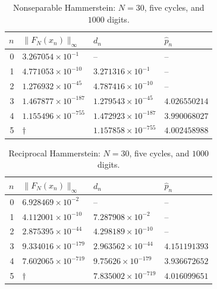 \documentclass[11pt,a4paper]{article}
\numberwithin{equation}{section}
\numberwithin{table}{section}
\theoremstyle{plain}
\theoremstyle{definition}\newtheorem{definition}[theorem]{Definition}
\theoremstyle{remark}\newtheorem{remark}[theorem]{Remark}
\begin{document}
\begin{table}[htbp]\centering\small
\begin{tabular}{@{}rlll@{}}\toprule
$n$ & $\|F_N(x_n)\|_\infty$ & $d_n$ & $\widehat p_n$\\\midrule
0 & $3.267054\times10^{-1}$ & -- & --\\
1 & $4.771053\times10^{-10}$ & $3.271316\times10^{-1}$ & --\\
2 & $1.276932\times10^{-45}$ & $4.787416\times10^{-10}$ & --\\
3 & $1.467877\times10^{-187}$ & $1.279543\times10^{-45}$ & $4.026550214$\\
4 & $1.155496\times10^{-755}$ & $1.472923\times10^{-187}$ & $3.990068027$\\
5 & $\dagger$ & $1.157858\times10^{-755}$ & $4.002458988$\\
\bottomrule\end{tabular}
\caption{Nonseparable Hammerstein: $N=30$, five cycles, and $1000$ digits.}\label{supp:tab:history-no_separable}
\end{table}
\begin{table}[htbp]\centering\small
\begin{tabular}{@{}rlll@{}}\toprule
$n$ & $\|F_N(x_n)\|_\infty$ & $d_n$ & $\widehat p_n$\\\midrule
0 & $6.928469\times10^{-2}$ & -- & --\\
1 & $4.112001\times10^{-10}$ & $7.287908\times10^{-2}$ & --\\
2 & $2.875395\times10^{-44}$ & $4.298189\times10^{-10}$ & --\\
3 & $9.334016\times10^{-179}$ & $2.963562\times10^{-44}$ & $4.151191393$\\
4 & $7.602065\times10^{-719}$ & $9.75626\times10^{-179}$ & $3.936672652$\\
5 & $\dagger$ & $7.835002\times10^{-719}$ & $4.016099651$\\
\bottomrule\end{tabular}
\caption{Reciprocal Hammerstein: $N=30$, five cycles, and $1000$ digits.}\label{supp:tab:history-reciproco}
\end{table}
\end{document}
